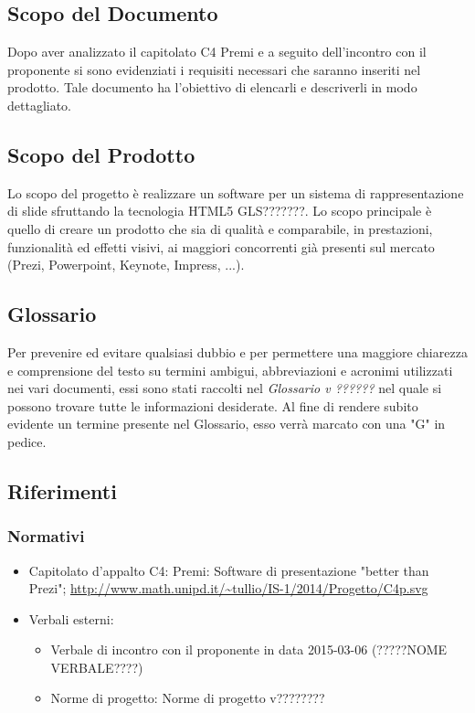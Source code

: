 \subsection{Scopo del Documento}
Dopo aver analizzato il capitolato C4 Premi e a seguito dell'incontro con il proponente si sono evidenziati i requisiti
necessari che saranno inseriti nel prodotto. Tale documento ha l'obiettivo di elencarli e descriverli in modo dettagliato.

\subsection{Scopo del Prodotto}
Lo scopo del progetto è realizzare un software per un sistema di rappresentazione di slide sfruttando la tecnologia HTML5 GLS???????.
Lo scopo principale è quello di creare un prodotto che sia di qualità e comparabile, in prestazioni, funzionalità ed 
effetti visivi, ai maggiori concorrenti già presenti sul mercato (Prezi, Powerpoint, Keynote, Impress, ...).

\subsection{Glossario}
Per prevenire ed evitare qualsiasi dubbio e per permettere una maggiore chiarezza e
comprensione del testo su termini ambigui, abbreviazioni e acronimi utilizzati nei vari documenti,
essi sono stati raccolti nel \textit{Glossario v ??????} nel quale si possono trovare tutte le informazioni desiderate.
Al fine di rendere subito evidente un termine presente nel Glossario, esso verrà marcato con una "G" in pedice.

\subsection{Riferimenti}
\subsubsection{Normativi}
\begin{itemize}
	\item Capitolato d'appalto C4: Premi: Software di presentazione "better than Prezi";
	\newline \url{http://www.math.unipd.it/~tullio/IS-1/2014/Progetto/C4p.svg}
	\item Verbali esterni:
	\begin{itemize}
		\item Verbale di incontro con il proponente in data 2015-03-06 (?????NOME VERBALE????)
		\item Norme di progetto: Norme di progetto v????????
	\end{itemize}
\end{itemize}
